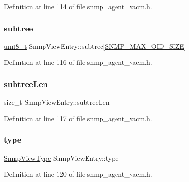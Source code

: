 Definition at line 114 of file snmp\+\_\+agent\+\_\+vacm.\+h.

\mbox{\label{structSnmpViewEntry_a640a3c23d13bbf9de16ebf23097abc12}} 
\subsubsection{\texorpdfstring{subtree}{subtree}}
{\footnotesize\ttfamily \hyperlink{stdint_8h_aba7bc1797add20fe3efdf37ced1182c5}{uint8\+\_\+t} Snmp\+View\+Entry\+::subtree\mbox{[}\hyperlink{snmp__common_8h_a7eee56441ee1b961702e8b4cbe9586a7}{S\+N\+M\+P\+\_\+\+M\+A\+X\+\_\+\+O\+I\+D\+\_\+\+S\+I\+ZE}\mbox{]}}



Definition at line 116 of file snmp\+\_\+agent\+\_\+vacm.\+h.

\mbox{\label{structSnmpViewEntry_a0b1d281049f1ea869ecb6a7af5a01cb1}} 
\subsubsection{\texorpdfstring{subtree\+Len}{subtreeLen}}
{\footnotesize\ttfamily size\+\_\+t Snmp\+View\+Entry\+::subtree\+Len}



Definition at line 117 of file snmp\+\_\+agent\+\_\+vacm.\+h.

\mbox{\label{structSnmpViewEntry_a32a9315f088375a8cd408ded58a20021}} 
\subsubsection{\texorpdfstring{type}{type}}
{\footnotesize\ttfamily \hyperlink{snmp__agent__vacm_8h_af9211ac922f85ec38c917879483643aa}{Snmp\+View\+Type} Snmp\+View\+Entry\+::type}



Definition at line 120 of file snmp\+\_\+agent\+\_\+vacm.\+h.

\mbox{\label{structSnmpViewEntry_a6ce36343aeaa16e8b824211598a769c5}} 
